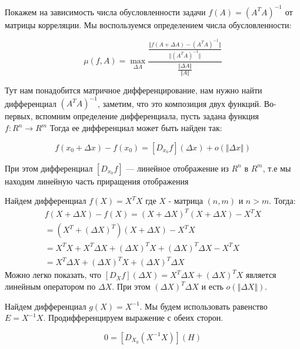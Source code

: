 \documentclass{article}
\begin{document}
    \quad

    Покажем на зависимость числа обусловленности задачи $f(A) = (A^T A)^{-1}$ от матрицы корреляции.
    Мы воспользуемся определением числа обусловленности:

    \begin{equation}
        \mu(f, A) = \max_{\Delta A} \frac{ \frac{\Vert f(A + \Delta A) - (A^T A)^{-1}  \Vert }{\Vert (A^T A)^{-1} \Vert} }{ \frac{\Vert \Delta A \Vert}{\Vert A \Vert} }
    \end{equation}

    Тут нам понадобится матричное дифференцирование, нам нужно найти дифференциал $(A^T A)^{-1}$, заметим, что это композиция двух функций.
    Во-первых, вспомним определение дифференциала, пусть задана функция $f: R^{n} \rightarrow R^{m}$
    Тогда ее дифференциал может быть найден так:

    \begin{equation}
        f(x_{0} + \Delta x) - f(x_{0}) = [D_{x_{0}} f](\Delta x) + o(\Vert \Delta x \Vert)
    \end{equation}

    При этом дифференциал $[D_{x_{0}} f]$ --- линейное отображение из $R^{n}$ в $R^{m}$, т.е мы находим линейную часть приращения отображения

    \quad

    Найдем дифференциал $f(X) = X^{T} X$ где $X$ - матрица $(n, m)$ и $n > m$.
    Тогда:
    \[
    \begin{gathered}
        f(X + \Delta X) - f(X) = (X + \Delta X)^{T} (X + \Delta X) - X^{T} X \\
        = (X^{T} + (\Delta X)^{T}) (X + \Delta X) - X^{T} X \\
        = X^{T} X + X^{T} \Delta X + (\Delta X)^{T} X + (\Delta X)^{T} \Delta X - X^{T} X \\
        = X^{T} \Delta X + (\Delta X)^{T} X + (\Delta X)^{T} \Delta X
    \end{gathered}
    \]
    Можно легко показать, что $[D_{X} f](\Delta X) = X^{T} \Delta X + (\Delta X)^{T} X$ является линейным оператором по $\Delta X$.
    При этом $(\Delta X)^{T} \Delta X$ и есть $o(\Vert \Delta X \Vert)$.

    \quad

    Найдем дифференциал $g(X) = X^{-1}$.
    Мы будем использовать равенство $E = X^{-1} X$.
    Продифференцируем выражение с обеих сторон.

    \begin{equation}
        0 = [D_{X_{0}} (X^{-1} X)](H)
    \end{equation}
\end{document}
